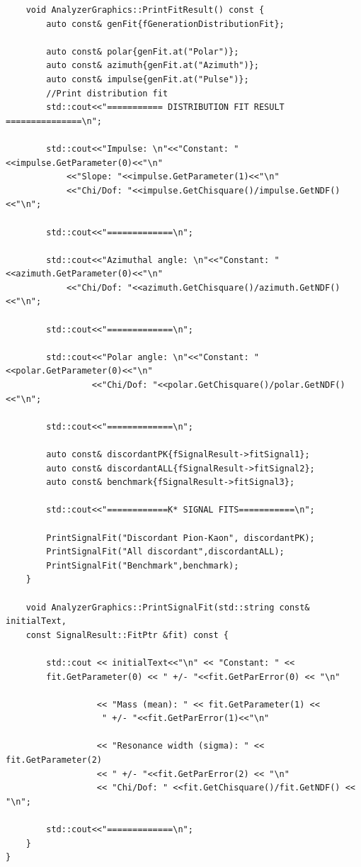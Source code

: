 \documentclass[12pt, a4paper]{article}
\begin{document}
\begin{verbatim}
    void AnalyzerGraphics::PrintFitResult() const {
        auto const& genFit{fGenerationDistributionFit};

        auto const& polar{genFit.at("Polar")};
        auto const& azimuth{genFit.at("Azimuth")};
        auto const& impulse{genFit.at("Pulse")};
        //Print distribution fit
        std::cout<<"=========== DISTRIBUTION FIT RESULT ===============\n";

        std::cout<<"Impulse: \n"<<"Constant: "<<impulse.GetParameter(0)<<"\n"
            <<"Slope: "<<impulse.GetParameter(1)<<"\n"
            <<"Chi/Dof: "<<impulse.GetChisquare()/impulse.GetNDF()<<"\n";

        std::cout<<"=============\n";

        std::cout<<"Azimuthal angle: \n"<<"Constant: "<<azimuth.GetParameter(0)<<"\n"
            <<"Chi/Dof: "<<azimuth.GetChisquare()/azimuth.GetNDF()<<"\n";

        std::cout<<"=============\n";

        std::cout<<"Polar angle: \n"<<"Constant: "<<polar.GetParameter(0)<<"\n"
                 <<"Chi/Dof: "<<polar.GetChisquare()/polar.GetNDF()<<"\n";

        std::cout<<"=============\n";

        auto const& discordantPK{fSignalResult->fitSignal1};
        auto const& discordantALL{fSignalResult->fitSignal2};
        auto const& benchmark{fSignalResult->fitSignal3};

        std::cout<<"============K* SIGNAL FITS===========\n";

        PrintSignalFit("Discordant Pion-Kaon", discordantPK);
        PrintSignalFit("All discordant",discordantALL);
        PrintSignalFit("Benchmark",benchmark);
    }

    void AnalyzerGraphics::PrintSignalFit(std::string const& initialText, 
    const SignalResult::FitPtr &fit) const {
    
        std::cout << initialText<<"\n" << "Constant: " << 
        fit.GetParameter(0) << " +/- "<<fit.GetParError(0) << "\n"
        
                  << "Mass (mean): " << fit.GetParameter(1) <<
                   " +/- "<<fit.GetParError(1)<<"\n"
                   
                  << "Resonance width (sigma): " << fit.GetParameter(2)
                  << " +/- "<<fit.GetParError(2) << "\n"
                  << "Chi/Dof: " <<fit.GetChisquare()/fit.GetNDF() << "\n";

        std::cout<<"=============\n";
    }
}

\end{verbatim}
\end{document}

